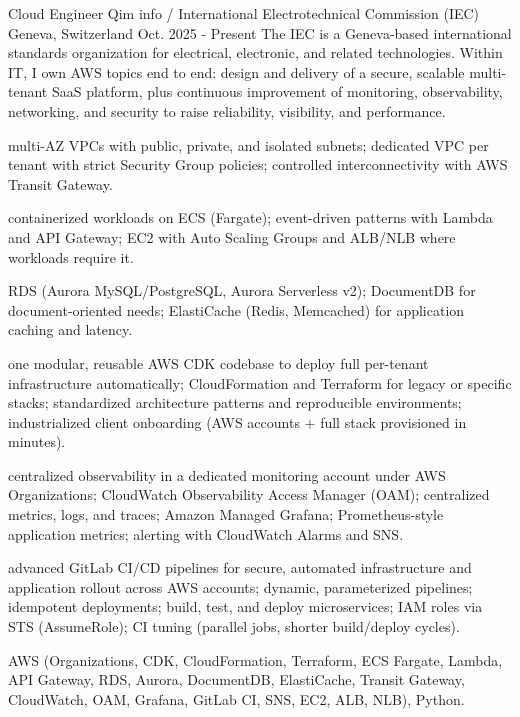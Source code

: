 

\begin{cventries}

  \cventrywithintro
    {Cloud Engineer}
    {Qim info / International Electrotechnical Commission (IEC)}
    {Geneva, Switzerland}
    {Oct. 2025 - Present}
    {The IEC is a Geneva-based international standards organization for electrical, electronic, and related technologies. Within IT, I own AWS topics end to end: design and delivery of a secure, scalable multi-tenant SaaS platform, plus continuous improvement of monitoring, observability, networking, and security to raise reliability, visibility, and performance.}
    {
      \begin{cvitemsafterintro}
        \item { multi-AZ VPCs with public, private, and isolated subnets; dedicated VPC per tenant with strict Security Group policies; controlled interconnectivity with AWS Transit Gateway.}
        \item { containerized workloads on ECS (Fargate); event-driven patterns with Lambda and API Gateway; EC2 with Auto Scaling Groups and ALB/NLB where workloads require it.}
        \item { RDS (Aurora MySQL/PostgreSQL, Aurora Serverless v2); DocumentDB for document-oriented needs; ElastiCache (Redis, Memcached) for application caching and latency.}
        \item { one modular, reusable AWS CDK codebase to deploy full per-tenant infrastructure automatically; CloudFormation and Terraform for legacy or specific stacks; standardized architecture patterns and reproducible environments; industrialized client onboarding (AWS accounts + full stack provisioned in minutes).}
        \item { centralized observability in a dedicated monitoring account under AWS Organizations; CloudWatch Observability Access Manager (OAM); centralized metrics, logs, and traces; Amazon Managed Grafana; Prometheus-style application metrics; alerting with CloudWatch Alarms and SNS.}
        \item { advanced GitLab CI/CD pipelines for secure, automated infrastructure and application rollout across AWS accounts; dynamic, parameterized pipelines; idempotent deployments; build, test, and deploy microservices; IAM roles via STS (AssumeRole); CI tuning (parallel jobs, shorter build/deploy cycles).}
      \end{cvitemsafterintro}
    }
    {AWS (Organizations, CDK, CloudFormation, Terraform, ECS Fargate, Lambda, API Gateway, RDS, Aurora, DocumentDB, ElastiCache, Transit Gateway, CloudWatch, OAM, Grafana, GitLab CI, SNS, EC2, ALB, NLB), Python.}


\end{cventries}
